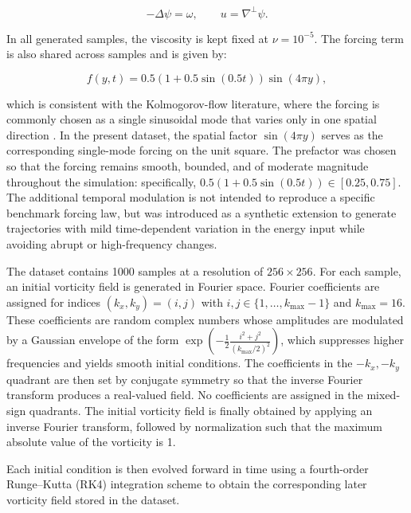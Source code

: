 \begin{equation}
    -\Delta \psi = \omega, \qquad u = \nabla^\perp \psi.
\end{equation}

In all generated samples, the viscosity is kept fixed at
$\nu = 10^{-5}$. The forcing term is also shared across samples and is
given by:

\begin{equation}
    f(y,t) = 0.5 \left(1 + 0.5 \sin(0.5 t)\right)\sin(4\pi y),
\end{equation}

which is consistent with the Kolmogorov-flow literature, where the
forcing is commonly chosen as a single sinusoidal mode that varies only
in one spatial direction \cite{chandler2013kolmogorov,vela2024kolmogorov}.
In the present dataset, the spatial factor $\sin(4\pi y)$ serves as the
corresponding single-mode forcing on the unit square. The prefactor was
chosen so that the forcing remains smooth, bounded, and of moderate
magnitude throughout the simulation: specifically,
$0.5(1 + 0.5\sin(0.5 t)) \in [0.25, 0.75]$. The additional temporal
modulation is not intended to reproduce a specific benchmark forcing
law, but was introduced as a synthetic extension to generate trajectories
with mild time-dependent variation in the energy input while avoiding
abrupt or high-frequency changes.

The dataset contains 1000 samples at a resolution of $256 \times 256$.
For each sample, an initial vorticity field is generated in Fourier
space. Fourier coefficients are assigned for indices
$(k_x,k_y) = (i,j)$ with $i,j \in \{1,\dots,k_{\max}-1\}$ and
$k_{\max}=16$. These coefficients are random complex numbers whose
amplitudes are modulated by a Gaussian envelope of the form
$\exp\!\left(-\frac{1}{2}\frac{i^2+j^2}{(k_{\max}/2)^2}\right)$, which
suppresses higher frequencies and yields smooth initial conditions. The
coefficients in the $-k_x,-k_y$ quadrant are then set by conjugate
symmetry so that the inverse Fourier transform produces a real-valued
field. No coefficients are assigned in the mixed-sign quadrants. The
initial vorticity field is finally obtained by applying an inverse
Fourier transform, followed by normalization such that the maximum absolute value of the vorticity is 1.

Each initial condition is then evolved forward in time using a
fourth-order Runge--Kutta (RK4) integration scheme to obtain the
corresponding later vorticity field stored in the dataset.


